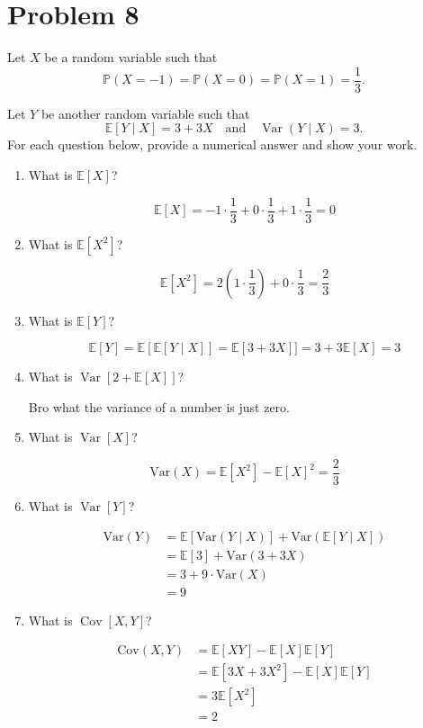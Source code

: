 \documentclass[11pt]{article}
\newcommand{\Var}{\text{Var}}
\newcommand{\Cov}{\text{Cov}}
\newcommand{\bbE}{\mathbb{E}}
\begin{document}
\section*{Problem 8}
\begin{problem}
    Let \( X \) be a random variable such that
\[
\mathbb{P}(X = -1) = \mathbb{P}(X = 0) = \mathbb{P}(X = 1) = \frac{1}{3}.
\]

Let \( Y \) be another random variable such that
\[
\mathbb{E}[Y \mid X] = 3 + 3X \quad \text{and} \quad \operatorname{Var}(Y \mid X) = 3.
\]
For each question below, provide a numerical answer and show your work.

\begin{enumerate}[label=(\alph*)]
    \item What is \( \mathbb{E}[X] \)?
\begin{solution}
    \[\bbE[X] = -1 \cdot \frac{1}{3} + 0 \cdot \frac{1}{3} + 1 \cdot \frac{1}{3} = \boxed{0}\]
\end{solution}
    \item What is \( \mathbb{E}[X^2] \)?
\begin{solution}
    \[\bbE[X^2] = 2(1\cdot \frac{1}{3}) + 0 \cdot \frac{1}{3} = \boxed{\frac{2}{3}}\]
\end{solution}
    \item What is \( \mathbb{E}[Y] \)?
    \begin{solution}
        
\[\bbE[Y] = \bbE[\bbE[Y \mid X]] = \bbE[3 + 3X]] = 3 + 3\bbE[X] = \boxed{3}\]
    \end{solution}

    \item What is \( \operatorname{Var}[2 + \mathbb{E}[X]] \)?
    \begin{solution}
        Bro what the variance of a number is just zero.
    \end{solution}
    \item What is \( \operatorname{Var}[X] \)?
    \begin{solution}
        \[\Var(X) = \bbE[X^2] - \bbE[X]^2 =\boxed{ \frac{2}{3}}\]
    \end{solution}
    \item What is \( \operatorname{Var}[Y] \)?
    \begin{solution}
\begin{align*}
\Var(Y) &= \bbE[\Var(Y \mid X)] + \Var(\bbE[Y \mid X])    \\
&= \bbE[3] + \Var(3 + 3X)\\
&= 3 + 9\cdot\Var(X)\\
&= \boxed{9}
\end{align*}
    \end{solution}
    \item What is \( \operatorname{Cov}[X, Y] \)?
\begin{solution}
\begin{align*}
\Cov(X,Y) &= \bbE[XY] - \bbE[X] \bbE[Y] \\
&= \bbE[3X + 3X^2] - \bbE[X]\bbE[Y]\\
&=  3\bbE[X^2] \\
&= \boxed{2}
\end{align*}


\end{solution}
\end{enumerate}
\end{problem}
\end{document}
